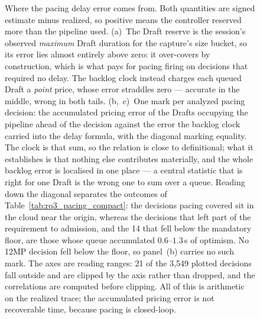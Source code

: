 \begin{figure}[t]
  \caption{Where the pacing delay error comes from.  Both quantities are signed
  estimate minus realized, so positive means the controller reserved more than
  the pipeline used.  (a)~The Draft reserve is the session's observed
  \emph{maximum} Draft duration for the capture's size bucket, so its error lies
  almost entirely above zero: it over-covers by construction, which is what pays
  for pacing firing on decisions that required no delay.  The backlog clock
  instead charges each queued Draft a \emph{point} price, whose error straddles
  zero --- accurate in the middle, wrong in both tails.  (b,~c)~One mark per
  analyzed pacing decision: the accumulated pricing error of the Drafts occupying
  the pipeline ahead of the decision against the error the backlog clock carried
  into the delay formula, with the diagonal marking equality.  The clock is that
  sum, so the relation is close to definitional; what it establishes is that
  nothing else contributes materially, and the whole backlog error is localised
  in one place --- a central statistic that is right for one Draft is the wrong
  one to sum over a queue.  Reading down the diagonal separates the
  outcomes of Table~\ref{tab:rq3_pacing_compact}: the decisions pacing covered
  sit in the cloud near the origin, whereas the decisions that left part of the
  requirement to admission, and the 14 that fell below the mandatory floor, are
  those whose queue accumulated $0.6$--$1.3$\,s of optimism.  No 12MP decision
  fell below the floor, so panel~(b) carries no such mark.  The axes are reading
  ranges: 21 of the 3{,}549 plotted decisions fall outside and are clipped by
  the axis rather than dropped, and the correlations are computed before
  clipping.  All of this is arithmetic
  on the realized trace; the accumulated pricing error is not recoverable time,
  because pacing is closed-loop.}
  \label{fig:rq3_pacing_compact}
\end{figure}
